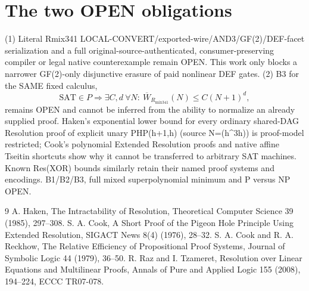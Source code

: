 \documentclass[11pt]{article}
\begin{document}
\section*{The two OPEN obligations}
(1) Literal Rmix341 LOCAL-CONVERT/exported-wire/AND3/GF(2)/DEF-facet serialization and a full original-source-authenticated, consumer-preserving compiler or legal native counterexample remain OPEN. This work only blocks a narrower GF(2)-only disjunctive erasure of paid nonlinear DEF gates. (2) B3 for the SAME fixed calculus,
\[
\mathrm{SAT}\in P\Longrightarrow\exists C,d\ \forall N:\ \overline W_{R_{\mathrm{mix341}}}(N)\le C(N+1)^d,
\]
remains OPEN and cannot be inferred from the ability to normalize an already supplied proof. Haken's exponential lower bound for every ordinary shared-DAG Resolution proof of explicit unary PHP(h+1,h) (source N=\Theta(h^3\log h)) is proof-model restricted; Cook's polynomial Extended Resolution proofs and native affine Tseitin shortcuts show why it cannot be transferred to arbitrary SAT machines. Known Res(XOR) bounds similarly retain their named proof systems and encodings. B1/B2/B3, full mixed superpolynomial minimum and P versus NP OPEN.

\begin{thebibliography}{9}
 A. Haken, The Intractability of Resolution, Theoretical Computer Science 39 (1985), 297--308.
 S. A. Cook, A Short Proof of the Pigeon Hole Principle Using Extended Resolution, SIGACT News 8(4) (1976), 28--32.
 S. A. Cook and R. A. Reckhow, The Relative Efficiency of Propositional Proof Systems, Journal of Symbolic Logic 44 (1979), 36--50.
 R. Raz and I. Tzameret, Resolution over Linear Equations and Multilinear Proofs, Annals of Pure and Applied Logic 155 (2008), 194--224, ECCC TR07-078.
\end{thebibliography}
\end{document}
